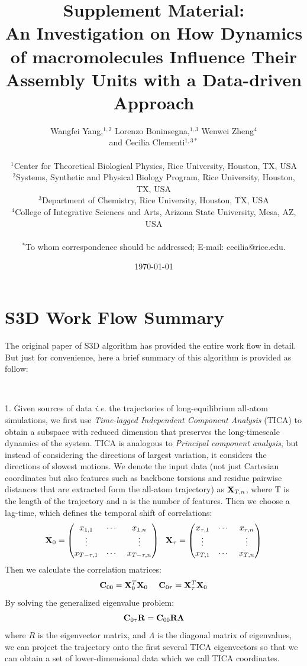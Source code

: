 \documentclass[12pt]{article}
\title{Supplement Material:\\ An Investigation on How Dynamics of macromolecules Influence Their Assembly Units with a Data-driven Approach}
\author
{Wangfei Yang,$^{1,2}$ Lorenzo Boninsegna,$^{1,3}$ Wenwei Zheng$^{4}$\\ and Cecilia Clementi$^{1,3\ast}$\\
\\
\normalsize{$^{1}$Center for Theoretical Biological Physics, Rice University, Houston, TX, USA}\\
\normalsize{$^{2}$Systems, Synthetic and Physical Biology Program, Rice University, Houston, TX, USA}\\
\normalsize{$^{3}$Department of Chemistry, Rice University, Houston, TX, USA}\\
\normalsize{$^{4}$College of Integrative Sciences and Arts, Arizona State University, Mesa, AZ, USA}\\
\\
\normalsize{$^\ast$To whom correspondence should be addressed; E-mail:  cecilia@rice.edu.}
}
\date{\today}
\begin{document}
\maketitle

\section*{S3D Work Flow Summary}

The original paper of S3D algorithm has provided the entire work flow in detail\cite{Lrenzo_S3D}. But just for convenience, here a brief summary of this algorithm is provided as follow:

\ \ 

\hangindent=0.7cm
1. Given sources of data {\it i.e.} the trajectories of long-equilibrium all-atom simulations, we first use {\it Time-lagged Independent Component Analysis} (TICA) to obtain a subspace with reduced dimension that preserves the long-timescale dynamics of the system\cite{TICA}. TICA is analogous to {\it Principal component analysis}, but instead of considering the directions of largest variation, it considers the directions of slowest motions. We denote the input data (not just Cartesian coordinates but also features such as backbone torsions and residue pairwise distances that are extracted form the all-atom trajectory) as ${\bf X}_{T, n}$, where T is the length of the trajectory and n is the number of features. Then we choose a lag-time, which defines the temporal shift of correlations:
\begin{equation}
{\bf X}_{0} = \begin{pmatrix}
x_{1,1} & \cdots\ & x_{1,n} \\
\vdots & & \vdots \\
x_{T-\tau,1} & \cdots\ & x_{T-\tau,n}\\
\end{pmatrix} \ \ 
{\bf X}_{\tau} = \begin{pmatrix}
x_{\tau,1} & \cdots\ & x_{\tau,n} \\
\vdots & & \vdots \\
x_{T,1} & \cdots\ & x_{T,n}\\
\end{pmatrix}
\end{equation}
Then we calculate the correlation matrices:
\begin{equation}
{\bf C}_{00} = {\bf X}_{0}^{T}{\bf X}_{0} \ \ \ \ 
{\bf C}_{0\tau} = {\bf X}_{\tau}^{T}{\bf X}_{0}
\end{equation}
By solving the generalized eigenvalue problem:
\begin{equation}
{\bf C}_{0\tau}{\bf R} = {\bf C}_{00}{\bf R}{\bf \Lambda}
\end{equation}
where $R$ is the eigenvector matrix, and $\Lambda$ is the diagonal matrix of eigenvalues, we can project the trajectory onto the first several TICA eigenvectors so that we can obtain a set of lower-dimensional data which we call TICA coordinates\cite{variational_approach,variational_principle}.
\end{document}
